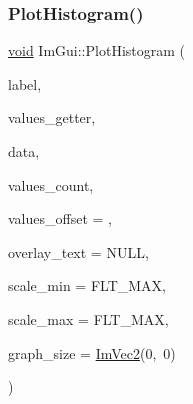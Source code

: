 \subsubsection{\texorpdfstring{Plot\+Histogram()}{PlotHistogram()}\hspace{0.1cm}{\footnotesize\ttfamily [2/2]}}
{\footnotesize\ttfamily \hyperlink{imgui__impl__opengl3__loader_8h_ac668e7cffd9e2e9cfee428b9b2f34fa7}{void} Im\+Gui\+::\+Plot\+Histogram (\begin{DoxyParamCaption}\item[{const char $\ast$}]{label,  }\item[{float($\ast$)(\hyperlink{imgui__impl__opengl3__loader_8h_ac668e7cffd9e2e9cfee428b9b2f34fa7}{void} $\ast$\hyperlink{imgui__impl__opengl3__loader_8h_abd87654504355b4c1bb002dcb1d4d16a}{data}, int idx)}]{values\+\_\+getter,  }\item[{\hyperlink{imgui__impl__opengl3__loader_8h_ac668e7cffd9e2e9cfee428b9b2f34fa7}{void} $\ast$}]{data,  }\item[{int}]{values\+\_\+count,  }\item[{int}]{values\+\_\+offset = {},  }\item[{const char $\ast$}]{overlay\+\_\+text = {\ttfamily NULL},  }\item[{float}]{scale\+\_\+min = {\ttfamily FLT\+\_\+MAX},  }\item[{float}]{scale\+\_\+max = {\ttfamily FLT\+\_\+MAX},  }\item[{\hyperlink{structImVec2}{Im\+Vec2}}]{graph\+\_\+size = {\ttfamily \hyperlink{structImVec2}{Im\+Vec2}(0,~0)} }\end{DoxyParamCaption})}

\mbox{\label{namespaceImGui_a2bc21c56e4796855313804086cca114f}} 

